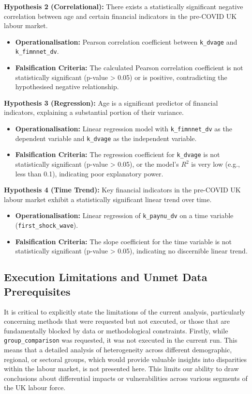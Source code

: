 \documentclass[11pt,a4paper]{article}
\begin{document}
\textbf{Hypothesis 2 (Correlational):} There exists a statistically significant negative correlation between age and certain financial indicators in the pre-COVID UK labour market.
\begin{itemize}
    \item \textbf{Operationalisation:} Pearson correlation coefficient between \texttt{k\_dvage} and \texttt{k\_fimnnet\_dv}.
    \item \textbf{Falsification Criteria:} The calculated Pearson correlation coefficient is not statistically significant (p-value > 0.05) or is positive, contradicting the hypothesised negative relationship.
\end{itemize}

\textbf{Hypothesis 3 (Regression):} Age is a significant predictor of financial indicators, explaining a substantial portion of their variance.
\begin{itemize}
    \item \textbf{Operationalisation:} Linear regression model with \texttt{k\_fimnnet\_dv} as the dependent variable and \texttt{k\_dvage} as the independent variable.
    \item \textbf{Falsification Criteria:} The regression coefficient for \texttt{k\_dvage} is not statistically significant (p-value > 0.05), or the model's $R^2$ is very low (e.g., less than 0.1), indicating poor explanatory power.
\end{itemize}

\textbf{Hypothesis 4 (Time Trend):} Key financial indicators in the pre-COVID UK labour market exhibit a statistically significant linear trend over time.
\begin{itemize}
    \item \textbf{Operationalisation:} Linear regression of \texttt{k\_paynu\_dv} on a time variable (\texttt{first\_shock\_wave}).
    \item \textbf{Falsification Criteria:} The slope coefficient for the time variable is not statistically significant (p-value > 0.05), indicating no discernible linear trend.
\end{itemize}

\subsection{Execution Limitations and Unmet Data Prerequisites}

It is critical to explicitly state the limitations of the current analysis, particularly concerning methods that were requested but not executed, or those that are fundamentally blocked by data or methodological constraints.
Firstly, while \texttt{group\_comparison} was requested, it was not executed in the current run. This means that a detailed analysis of heterogeneity across different demographic, regional, or sectoral groups, which would provide valuable insights into disparities within the labour market, is not presented here. This limits our ability to draw conclusions about differential impacts or vulnerabilities across various segments of the UK labour force.
\end{document}
